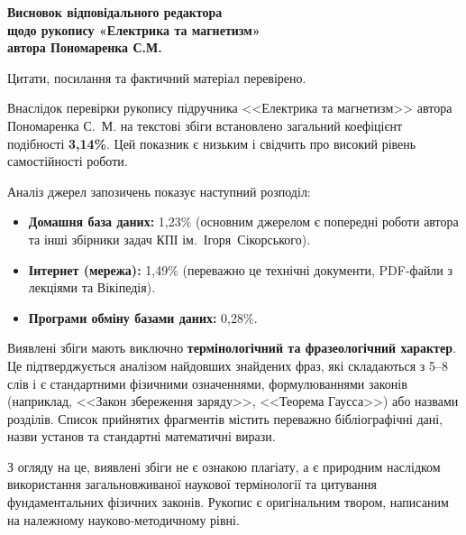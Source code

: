 \documentclass[14pt,a4paper]{extarticle}
\begin{document}
\begin{center}
    \textbf{\large Висновок відповідального редактора}\\[0.5em]
    \textbf{щодо рукопису «Електрика та магнетизм»}\\[0.2em]
    \textbf{автора Пономаренка С.М.}
\end{center}

\vspace{1.5em}

\noindent Цитати, посилання та фактичний матеріал перевірено.

\vspace{0.5em}
Внаслідок перевірки рукопису підручника <<Електрика та магнетизм>> автора Пономаренка С.~М. на текстові збіги встановлено загальний коефіцієнт подібності \textbf{3,14\%}. Цей показник є низьким і свідчить про високий рівень самостійності роботи.

Аналіз джерел запозичень показує наступний розподіл:
\begin{itemize}
    \item \textbf{Домашня база даних:} 1,23\% (основним джерелом є попередні роботи автора та інші збірники задач КПІ ім.~Ігоря~Сікорського).
    \item \textbf{Інтернет (мережа):} 1,49\% (переважно це технічні документи, PDF-файли з лекціями та Вікіпедія).
    \item \textbf{Програми обміну базами даних:} 0,28\%.
\end{itemize}

Виявлені збіги мають виключно \textbf{термінологічний та фразеологічний характер}. Це підтверджується аналізом найдовших знайдених фраз, які складаються з 5--8 слів і є стандартними фізичними означеннями, формулюваннями законів (наприклад, <<Закон збереження заряду>>, <<Теорема Гаусса>>) або назвами розділів. Список прийнятих фрагментів містить переважно бібліографічні дані, назви установ та стандартні математичні вирази.

З огляду на це, виявлені збіги не є ознакою плагіату, а є природним наслідком використання загальновживаної наукової термінології та цитування фундаментальних фізичних законів. Рукопис є оригінальним твором, написаним на належному науково-методичному рівні.
\end{document}
